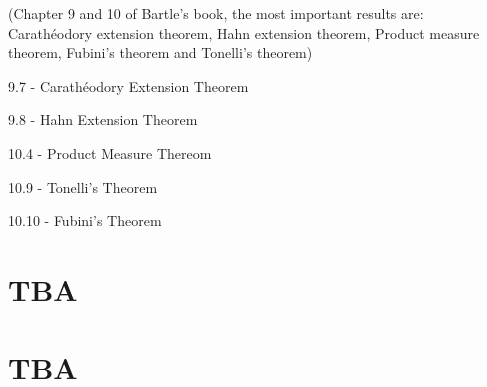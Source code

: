 \documentclass{article}
\numberwithin{equation}{section}
\begin{document}
(Chapter 9 and 10 of Bartle's book, the most important results are: Carathéodory extension theorem, Hahn extension theorem, Product measure theorem, Fubini's theorem and Tonelli's theorem)

9.7 - Carathéodory Extension Theorem

9.8 - Hahn Extension Theorem

10.4 - Product Measure Thereom

10.9 - Tonelli's Theorem

10.10 - Fubini's Theorem

\newpage

\section{TBA}

\newpage

\section{TBA}
\end{document}
